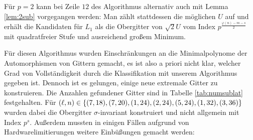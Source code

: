 \documentclass[12pt,a4paper,halfparskip,headsepline,bibtotocnumbered]{scrreprt}
\theoremstyle{nummermitklammern}
\theoremstyle{nonumberbreak}
\begin{document}
Für $p = 2$ kann bei Zeile $12$ des Algorithmus alternativ auch mit Lemma \eqref{lem:2sub} vorgegangen werden: Man zählt stattdessen die möglichen $U$ auf und erhält die Kandidaten für $L_1$ als die Obergitter von $\sqrt{2} U$ vom Index $p^\frac{\varphi(n)-m - s}{2}$ mit quadratfreier Stufe und ausreichend großem Minimum.\par
Für diesen Algorithmus wurden Einschränkungen an die Minimalpolynome der Automorphismen von Gittern gemacht, es ist also a priori nicht klar, welcher Grad von Vollständigkeit durch die Klassifikation mit unserem Algorithmus gegeben ist. Dennoch ist es gelungen, einige neue extremale Gitter zu konstruieren. Die Anzahlen gefundener Gitter sind in Tabelle \eqref{tab:numsublat} festgehalten. Für $(\ell, n) \in \lbrace (7,18), (7,20), (1,24), (2,24), (5,24),\linebreak
 (1,32), (3,36) \rbrace$ wurden dabei die Obergitter $\sigma$-invariant konstruiert und nicht allgemein mit Index $p^s$. Außerdem mussten in einigen Fällen aufgrund von Hardwarelimitierungen weitere Einbüßungen gemacht werden:
\end{document}
